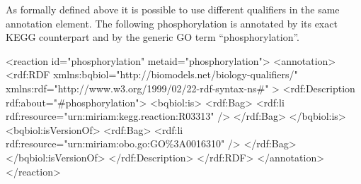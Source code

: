 As formally defined above it is possible to use different
qualifiers in the same annotation element. The following
phosphorylation is annotated by its exact KEGG counterpart and by
the generic GO term ``phosphorylation''.

\begin{blockChanged}
\begin{example}
<reaction id="phosphorylation" metaid="phosphorylation">
  <annotation>
    <rdf:RDF
      xmlns:bqbiol="http://biomodels.net/biology-qualifiers/"
      xmlns:rdf="http://www.w3.org/1999/02/22-rdf-syntax-ns\#"
    >
      <rdf:Description rdf:about="\#phosphorylation">
        <bqbiol:is>
          <rdf:Bag>
            <rdf:li rdf:resource="urn:miriam:kegg.reaction:R03313" />
          </rdf:Bag>
        </bqbiol:is>
        <bqbiol:isVersionOf>
          <rdf:Bag>
            <rdf:li rdf:resource="urn:miriam:obo.go:GO\%3A0016310" />
          </rdf:Bag>
        </bqbiol:isVersionOf>
      </rdf:Description>
    </rdf:RDF>
  </annotation>
</reaction>
\end{example}
\end{blockChanged}
